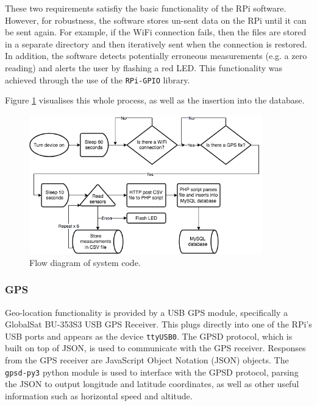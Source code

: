 \documentclass[11pt]{report}
\begin{document}
These two requirements satisfiy the basic functionality of the RPi software. However, for robustness, the software stores un-sent data on the RPi until it can be sent again. For example, if the WiFi connection fails, then the files are stored in a separate directory and then iteratively sent when the connection is restored. In addition, the software detects potentially erroneous measurements (e.g. a zero reading) and alerts the user by flashing a red LED. This functionality was achieved through the use of the \texttt{RPi-GPIO} library. 


Figure \ref{code_flow} visualises this whole process, as well as the insertion into the database.


\begin{figure}[!tb]
\centering
\includegraphics[width=0.9\textwidth]{images/code_flow}
\caption{Flow diagram of system code.}
\label{code_flow}
\end{figure}

\subsubsection{GPS}

Geo-location functionality is provided by a USB GPS module, specifically a GlobalSat BU-353S3 USB GPS Receiver. This plugs directly into one of the RPi's USB ports and appears as the device \texttt{ttyUSB0}. The GPSD protocol, which is built on top of JSON, is used to communicate with the GPS receiver. Responses from the GPS receiver are JavaScript Object Notation (JSON) objects. The \texttt{gpsd-py3} python module is used to interface with the GPSD protocol, parsing the JSON to output longitude and latitude coordinates, as well as other useful information such as horizontal speed and altitude. 
\end{document}
